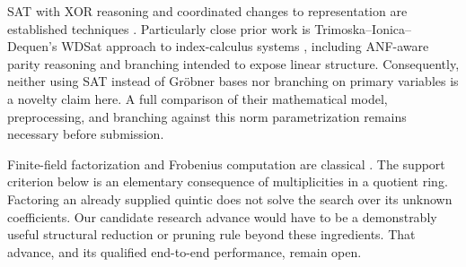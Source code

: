 SAT with XOR reasoning and coordinated changes to representation are established
techniques \cite{cms}. Particularly close prior work is
Trimoska--Ionica--Dequen's WDSat approach to index-calculus systems
\cite{wdsat}, including ANF-aware parity reasoning and branching intended to
expose linear structure. Consequently, neither using SAT instead of Gr\"obner
bases nor branching on primary variables is a novelty claim here.
A full comparison of their mathematical model, preprocessing, and branching
against this norm parametrization remains necessary before submission.

Finite-field factorization and Frobenius computation are classical
\cite{cz,frobenius}. The support criterion below is an elementary consequence
of multiplicities in a quotient ring. Factoring an already supplied quintic
does not solve the search over its unknown coefficients. Our candidate research
advance would have to be a demonstrably useful structural reduction or pruning
rule beyond these ingredients. That advance, and its qualified end-to-end
performance, remain open.

